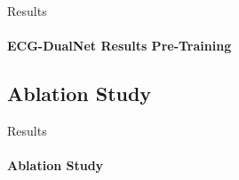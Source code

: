 \begin{frame}{Results}
\framesubtitle{ECG-DualNet Results Pre-Training}
    \begin{table}[!ht]
        \centering
        \caption{Classification results of our proposed approaches on the Icentia$11$k validation set. Only a single training for each model run was conducted.}
        \small{}
        \label{tab:results_Icentia11k}
    \end{table}
    \pause
    \begin{table}[!ht]
        \centering
        \caption{Classification results of our proposed approaches on the 2017 PhysioNet validation set and \newline pre-trained on the Icentia$11$k dataset. Differences to values of no pre-training results in red.}
        \small{}
        \label{tab:pretraining_results}
    \end{table}
\end{frame}

\subsection{Ablation Study}
\begin{frame}{Results}
\framesubtitle{Ablation Study}
    \begin{table}[h!]
        \centering
        \caption{Classification results on the 2017 PhysioNet validation for different ablations. ECG-DualNet L configuration utilized.}
        
        \label{tab:ablations}
    \end{table}
\end{frame}